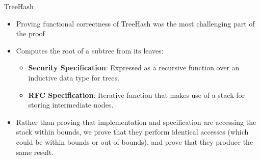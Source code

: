 \begin{frame}{TreeHash}

      \begin{itemize}
          \setlength{\itemsep}{4mm}
        \item Proving functional correctness of TreeHash was the most challenging part of the proof
        \item Computes the root of a subtree from its leaves: 
        \begin{itemize}
        \item \textbf{Security Specification}: Expressed as a
          recursive function over an inductive data type for trees.
        \item \textbf{RFC Specification}: Iterative function that
          makes use of a stack for storing intermediate nodes. 
        \end{itemize}
        \item Rather than proving that implementation and specification are
accessing the stack within bounds, we prove
that they perform identical accesses (which could be within bounds or out of bounds), and
prove that they produce the same result.
      \end{itemize}

\end{frame}
